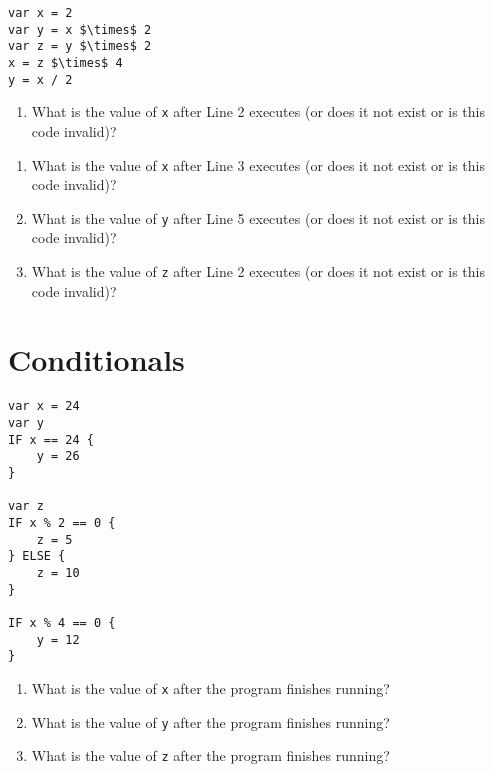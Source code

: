 \documentclass{article}
\begin{document}
\begin{Exercise}

\begin{lstlisting}[caption={Pseudocode.}, label={code:exercise_var_3},mathescape]
var x = 2
var y = x $\times$ 2
var z = y $\times$ 2
x = z $\times$ 4
y = x / 2
\end{lstlisting}

\begin{enumerate}
\item What is the value of \lstinline{x} after Line 2 executes (or does it not exist or is this code invalid)?
\end{enumerate}

\begin{enumerate}
\item What is the value of \lstinline{x} after Line 3 executes (or does it not exist or is this code invalid)?
\item What is the value of \lstinline{y} after Line 5 executes (or does it not exist or is this code invalid)?
\item What is the value of \lstinline{z} after Line 2 executes (or does it not exist or is this code invalid)?
\end{enumerate}

\end{Exercise}

\section{Conditionals}

\begin{Exercise}
\begin{lstlisting}[caption={Pseudocode.}, label={code:exercise_conditionals_1},mathescape]
var x = 24
var y
IF x == 24 {
    y = 26
}

var z
IF x % 2 == 0 {
    z = 5
} ELSE {
    z = 10
}

IF x % 4 == 0 {
    y = 12
}
\end{lstlisting}

\begin{enumerate}
\item What is the value of \lstinline{x} after the program finishes running?
\item What is the value of \lstinline{y} after the program finishes running?
\item What is the value of \lstinline{z} after the program finishes running?
\end{enumerate}
\end{Exercise}
\end{document}
